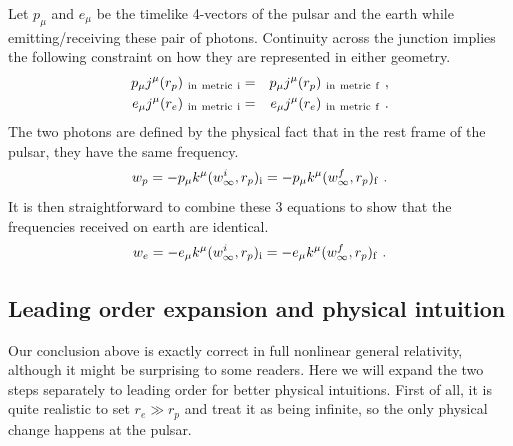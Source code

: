 \documentclass[aps,showpacs,twocolumn,floats,prd,superscriptaddress,nofootinbib]{revtex4}
\begin{document}
Let $p_\mu$ and $e_\mu$ be the timelike 4-vectors of the pulsar and the earth while emitting/receiving these pair of photons. Continuity across the junction implies the following constraint on how they are represented in either geometry.
\begin{eqnarray}
p_\mu j^\mu(r_p)_{\rm \ in \ metric \ i} &=& 
p_\mu j^\mu(r_p)_{\rm \ in \ metric \ f}~,
\label{eq-JuncPuls} \\ 
e_\mu j^\mu(r_e)_{\rm \ in \ metric \ i} &=& 
e_\mu j^\mu(r_e)_{\rm \ in \ metric \ f}~.
\end{eqnarray}
The two photons are defined by the physical fact that in the rest frame of the pulsar, they have the same frequency.
\begin{equation}
w_p = -p_\mu k^\mu(w^i_\infty, r_p)_{\rm i} = 
-p_\mu k^\mu(w^f_\infty, r_p)_{\rm f}~.
\label{eq-PulsEmit}
\end{equation}
It is then straightforward to combine these 3 equations to show that the frequencies received on earth are identical.
\begin{equation}
w_e = -e_\mu k^\mu(w^i_\infty, r_p)_{\rm i} = 
-e_\mu k^\mu(w^f_\infty, r_p)_{\rm f}~.
\end{equation}

\subsection{Leading order expansion and physical intuition}

Our conclusion above is exactly correct in full nonlinear general relativity, although it might be surprising to some readers. Here we will expand the two steps separately to leading order for better physical intuitions. First of all, it is quite realistic to set $r_e \gg r_p$ and treat it as being infinite, so the only physical change happens at the pulsar.
\end{document}
